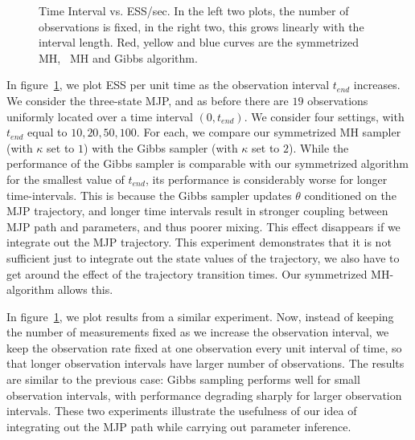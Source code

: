 {\begin{figure}
\begin{minipage}[hp]{0.24\linewidth}
  \end{minipage}
    \caption{Time Interval vs. ESS/sec. In the left two plots, the number of 
    observations is fixed, in the right two, this grows linearly with the
  interval length. Red, yellow and blue curves are the symmetrized MH,
  \naive\ MH and Gibbs algorithm.}
     \label{fig:TSS}
  \end{figure}
In figure~\ref{fig:TSS}, we plot ESS per unit time as the observation 
interval $t_{end}$ increases. We consider the three-state MJP, and as before there 
are $19$ observations uniformly located over a time interval $(0,t_{end})$. We 
consider four settings, with $t_{end}$ equal to $10, 20, 50, 100$. For each, we 
compare our symmetrized MH sampler (with $\kappa$ set to $1$) with the Gibbs 
sampler (with $\kappa$ set to $2$). While the performance of the Gibbs sampler 
is comparable with our symmetrized algorithm for the smallest value of 
$t_{end}$, its performance is considerably worse for longer time-intervals. 
This is because the Gibbs sampler updates $\theta$ conditioned on the MJP
trajectory, and longer time intervals result in stronger coupling 
between MJP path and parameters, and thus poorer mixing. This effect 
disappears if we integrate out the MJP trajectory. This experiment 
demonstrates that it is not sufficient just to integrate out the state 
values of the trajectory, we also have to get around the effect 
of the trajectory transition times. Our symmetrized MH-algorithm allows 
this. 


In figure~\ref{fig:TSS}, we plot results from a similar experiment. Now,
instead of keeping the number of measurements fixed as we increase the 
observation interval, we keep the observation rate fixed at one observation 
every unit interval of time, so that longer observation intervals have larger 
number of observations. The results are similar to the previous case: Gibbs 
sampling performs well for small observation intervals, with performance 
degrading sharply for larger observation intervals. These two experiments 
illustrate the usefulness of our idea of integrating out the MJP path while 
carrying out parameter inference.

}
